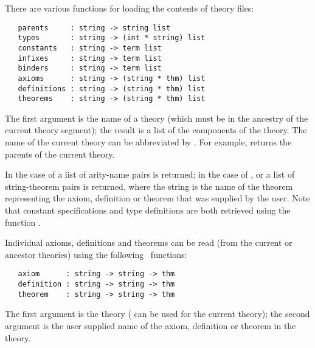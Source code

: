 There are various functions for loading the contents of theory files:

\begin{boxed}
\begin{verbatim}
   parents     : string -> string list
   types       : string -> (int * string) list
   constants   : string -> term list
   infixes     : string -> term list
   binders     : string -> term list
   axioms      : string -> (string * thm) list
   definitions : string -> (string * thm) list
   theorems    : string -> (string * thm) list
\end{verbatim}\end{boxed}

\noindent The first argument is the name of a theory (which must be in the
ancestry of the current theory segment); the result is a list of the
components of the theory. The name of the current theory can be abbreviated by
. For example,  returns the parents of the current
theory.

In the case of  a list of arity-name pairs is returned; in the
case of  ,  or  a list
of string-theorem
pairs is returned, where the string is the name of the theorem representing the
axiom, definition or theorem that was supplied by the user. Note that constant
specifications and type definitions are both retrieved using the function
.


Individual axioms, definitions and theorems can be read (from the current or
ancestor theories) using the following \ML\ functions:

\begin{boxed}
\begin{verbatim}
   axiom      : string -> string -> thm
   definition : string -> string -> thm
   theorem    : string -> string -> thm
\end{verbatim}\end{boxed}

\noindent The  first  argument  is  the  theory (  can be  used for the
current theory); the second argument is  the user  supplied name  of the axiom,
definition or theorem in the theory.

